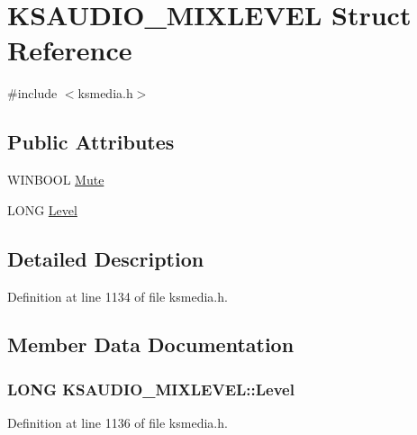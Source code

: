 \hypertarget{struct_k_s_a_u_d_i_o___m_i_x_l_e_v_e_l}{}\section{K\+S\+A\+U\+D\+I\+O\+\_\+\+M\+I\+X\+L\+E\+V\+EL Struct Reference}
\label{struct_k_s_a_u_d_i_o___m_i_x_l_e_v_e_l}


{\ttfamily \#include $<$ksmedia.\+h$>$}

\subsection*{Public Attributes}
\begin{DoxyCompactItemize}
\item 
W\+I\+N\+B\+O\+OL \hyperlink{struct_k_s_a_u_d_i_o___m_i_x_l_e_v_e_l_a13b95951eab748d7ba968a019aab96b8}{Mute}
\item 
L\+O\+NG \hyperlink{struct_k_s_a_u_d_i_o___m_i_x_l_e_v_e_l_ad87229325474309e9b41b7f7f0f5a918}{Level}
\end{DoxyCompactItemize}


\subsection{Detailed Description}


Definition at line 1134 of file ksmedia.\+h.



\subsection{Member Data Documentation}
\subsubsection[{\texorpdfstring{Level}{Level}}]{\setlength{\rightskip}{0pt plus 5cm}L\+O\+NG K\+S\+A\+U\+D\+I\+O\+\_\+\+M\+I\+X\+L\+E\+V\+E\+L\+::\+Level}\hypertarget{struct_k_s_a_u_d_i_o___m_i_x_l_e_v_e_l_ad87229325474309e9b41b7f7f0f5a918}{}\label{struct_k_s_a_u_d_i_o___m_i_x_l_e_v_e_l_ad87229325474309e9b41b7f7f0f5a918}


Definition at line 1136 of file ksmedia.\+h.

